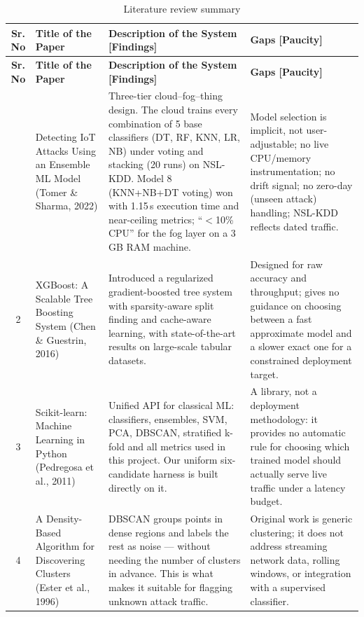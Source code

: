 \documentclass[12pt,a4paper]{article}
\begin{document}
\begingroup
\footnotesize
\renewcommand{\arraystretch}{1.3}
\begin{longtable}{|c|p{2.3cm}|p{5.8cm}|p{5.0cm}|}
\caption{Literature review summary}\label{tab:lit}\\
\hline
\textbf{Sr. No} & \textbf{Title of the Paper} & \textbf{Description of the System [Findings]} & \textbf{Gaps [Paucity]}\\
\hline
\endfirsthead
\hline
\textbf{Sr. No} & \textbf{Title of the Paper} & \textbf{Description of the System [Findings]} & \textbf{Gaps [Paucity]}\\
\hline
\endhead
\hline
\endfoot
\hline
\endlastfoot
1 & Detecting IoT Attacks Using an Ensemble ML Model (Tomer \& Sharma, 2022) & Three-tier cloud--fog--thing design. The cloud trains every combination of 5 base classifiers (DT, RF, KNN, LR, NB) under voting and stacking (20 runs) on NSL-KDD. Model 8 (KNN+NB+DT voting) won with 1.15\,s execution time and near-ceiling metrics; ``$<$10\% CPU'' for the fog layer on a 3\,GB RAM machine. & Model selection is implicit, not user-adjustable; no live CPU/memory instrumentation; no drift signal; no zero-day (unseen attack) handling; NSL-KDD reflects dated traffic.\\
\hline
2 & XGBoost: A Scalable Tree Boosting System (Chen \& Guestrin, 2016) & Introduced a regularized gradient-boosted tree system with sparsity-aware split finding and cache-aware learning, with state-of-the-art results on large-scale tabular datasets. & Designed for raw accuracy and throughput; gives no guidance on choosing between a fast approximate model and a slower exact one for a constrained deployment target.\\
\hline
3 & Scikit-learn: Machine Learning in Python (Pedregosa et al., 2011) & Unified API for classical ML: classifiers, ensembles, SVM, PCA, DBSCAN, stratified k-fold and all metrics used in this project. Our uniform six-candidate harness is built directly on it. & A library, not a deployment methodology: it provides no automatic rule for choosing which trained model should actually serve live traffic under a latency budget.\\
\hline
4 & A Density-Based Algorithm for Discovering Clusters (Ester et al., 1996) & DBSCAN groups points in dense regions and labels the rest as noise --- without needing the number of clusters in advance. This is what makes it suitable for flagging unknown attack traffic. & Original work is generic clustering; it does not address streaming network data, rolling windows, or integration with a supervised classifier.\\

\end{longtable}
\end{document}
